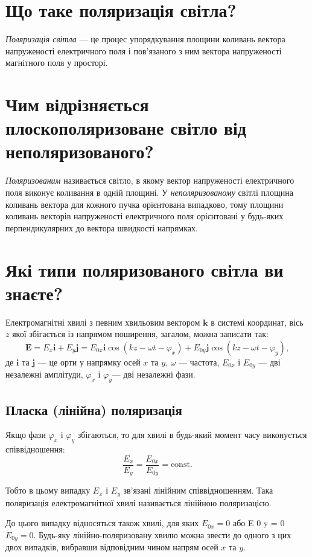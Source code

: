 \documentclass[a4paper,oneside,DIV=10,12pt]{scrartcl}
\begin{document}
	\section{Що таке поляризація світла?}
		\emph{Поляризація світла} --- це процес упорядкування площини коливань вектора напруженості електричного поля і пов'язаного з ним вектора напруженості магнітного поля у просторі.
			
	\section{Чим відрізняється плоскополяризоване світло від неполяризованого?}
		\emph{Поляризованим} називається світло, в якому вектор напруженості електричного поля виконує коливання в одній площині. У \emph{неполяризованому} світлі площина коливань вектора для кожного пучка орієнтована випадково, тому площини коливань векторів напруженості електричного поля орієнтовані у будь-яких перпендикулярних до вектора швидкості напрямках.
			
	\section{Які типи поляризованого світла ви знаєте?}
		Електромагнітні хвилі з певним хвильовим вектором $\mathbf{k}$ в системі координат, вісь $z$ якої збігається із напрямом поширення, загалом, можна записати так:
		\[
			\mathbf{E} = E_{x} \mathbf{i} + E_{y} \mathbf{j} = E_{0x} \mathbf{i} \cos(kz - \omega t - \varphi_{x}) + E_{0y} \mathbf{j} \cos(kz - \omega t - \varphi_{y}),
		\]
		де $\mathbf{i}$ та $\mathbf{j}$  — це орти у напрямку осей $x$ та $y$, $\omega$ — частота, $E_{0x}$ і $E_{0y}$ — дві незалежні амплітуди, $\varphi_{x}$ і $\varphi_{y}$— дві незалежні фази.
		
		\subsection{Пласка (лінійна) поляризація}
			Якщо фази $\varphi_x$ і $\varphi_y$ збігаються, то для хвилі в будь-який момент часу виконується співвідношення:
			\[
				\frac {E_{x}}{E_{y}}= \frac {E_{0x}}{E_{0y}} = {\text{const}}.
			\]
			
			Тобто в цьому випадку $E_{x}$ і $E_{y}$ зв'язані лінійним співвідношенням. Така поляризація електромагнітної хвилі називається лінійною поляризацією.
			
			До цього випадку відносяться також хвилі, для яких $E_{0x}=0$ або E 0 y = 0 $E_{0y}=0$. Будь-яку лінійно-поляризовану хвилю можна звести до одного з цих двох випадків, вибравши відповідним чином напрям осей $x$ та $y$.
			
\end{document}
